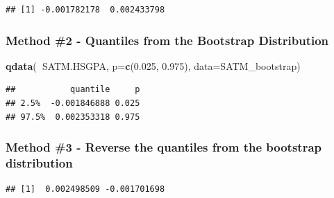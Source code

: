 \documentclass[]{article}
\newenvironment{Shaded}{\begin{snugshade}}{\end{snugshade}}
\newcommand{\DataTypeTok}[1]{\textcolor[rgb]{0.13,0.29,0.53}{#1}}
\newcommand{\FloatTok}[1]{\textcolor[rgb]{0.00,0.00,0.81}{#1}}
\newcommand{\KeywordTok}[1]{\textcolor[rgb]{0.13,0.29,0.53}{\textbf{#1}}}
\newcommand{\NormalTok}[1]{#1}
\newcommand{\OperatorTok}[1]{\textcolor[rgb]{0.81,0.36,0.00}{\textbf{#1}}}
\newcommand{\StringTok}[1]{\textcolor[rgb]{0.31,0.60,0.02}{#1}}
\begin{document}
\begin{verbatim}
## [1] -0.001782178  0.002433798
\end{verbatim}

\hypertarget{method-2---quantiles-from-the-bootstrap-distribution}{%
\subsubsection{Method \#2 - Quantiles from the Bootstrap
Distribution}\label{method-2---quantiles-from-the-bootstrap-distribution}}

\begin{Shaded}
\begin{Highlighting}[]
\KeywordTok{qdata}\NormalTok{(}\OperatorTok{~}\NormalTok{SATM.HSGPA, }\DataTypeTok{p=}\KeywordTok{c}\NormalTok{(}\FloatTok{0.025}\NormalTok{, }\FloatTok{0.975}\NormalTok{), }\DataTypeTok{data=}\NormalTok{SATM_bootstrap)}
\end{Highlighting}
\end{Shaded}

\begin{verbatim}
##           quantile     p
## 2.5%  -0.001846888 0.025
## 97.5%  0.002353318 0.975
\end{verbatim}

\hypertarget{method-3---reverse-the-quantiles-from-the-bootstrap-distribution}{%
\subsubsection{Method \#3 - Reverse the quantiles from the bootstrap
distribution}\label{method-3---reverse-the-quantiles-from-the-bootstrap-distribution}}

\begin{Shaded}
\end{Shaded}

\begin{verbatim}
## [1]  0.002498509 -0.001701698
\end{verbatim}
\end{document}
